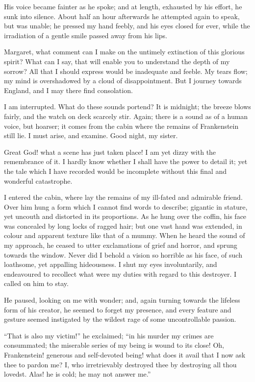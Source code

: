 His voice became fainter as he
spoke; and at length, exhausted by
his effort, he sunk into silence. About
half an hour afterwards he attempted
again to speak, but was unable; he
pressed my hand feebly, and his eyes
closed for ever, while the irradiation
of a gentle smile passed away from his
lips.

Margaret, what comment can I make
on the untimely extinction of this glorious
spirit? What can I say, that will
enable you to understand the depth of
my sorrow? All that I should express
would be inadequate and feeble. My
tears flow; my mind is overshadowed
by a cloud of disappointment. But I
journey towards England, and I may
there find consolation.

I am interrupted. What do these
sounds portend? It is midnight; the
breeze blows fairly, and the watch on
deck scarcely stir. Again; there is a
sound as of a human voice, but
hoarser; it comes from the cabin where
the remains of Frankenstein still lie.
I must arise, and examine. Good night,
my sister.

Great God! what a scene has just
taken place! I am yet dizzy with the
remembrance of it. I hardly know
whether I shall have the power to detail
it; yet the tale which I have recorded
would be incomplete without
this final and wonderful catastrophe.

I entered the cabin, where lay the
remains of my ill-fated and admirable
friend. Over him hung a form which
I cannot find words to describe; gigantic
in stature, yet uncouth and distorted
in its proportions. As he hung
over the coffin, his face was concealed by
long locks of ragged hair; but one vast
hand was extended, in colour and apparent
texture like that of a mummy.
When he heard the sound of my approach,
he ceased to utter exclamations
of grief and horror, and sprung towards
the window. Never did I behold
a vision so horrible as his face, of such
loathsome, yet appalling hideousness.
I shut my eyes involuntarily, and endeavoured
to recollect what were my
duties with regard to this destroyer.
I called on him to stay.

He paused, looking on me with wonder;
and, again turning towards the
lifeless form of his creator, he seem\-ed
to forget my presence, and every feature
and gesture seemed instigated by
the wildest rage of some uncontrollable
passion.

``That is also my victim!'' he exclaimed;
``in his murder my crimes are
consummated; the miserable series of
my being is wound to its close! Oh,
Frankenstein! generous and self-devoted
being! what does it avail that
I now ask thee to pardon me? I, who
irretrievably destroyed thee by destroying
all thou lovedst. Alas! he is cold;
he may not answer me.''

